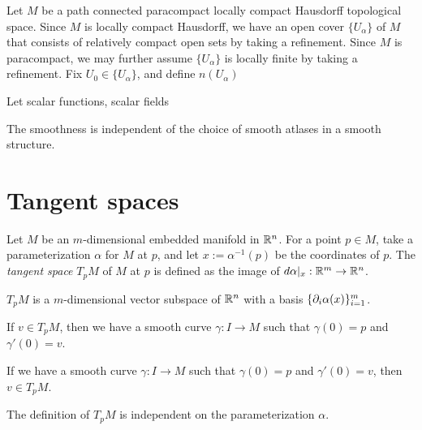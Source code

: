 \documentclass{../../large}
\renewcommand{\a}{\alpha}
\begin{document}
\begin{prb}

\end{prb}
\begin{pf}
Let $M$ be a path connected paracompact locally compact Hausdorff topological space.
Since $M$ is locally compact Hausdorff, we have an open cover $\{U_\alpha\}$ of $M$ that consists of relatively compact open sets by taking a refinement.
Since $M$ is paracompact, we may further assume $\{U_\alpha\}$ is locally finite by taking a refinement.
Fix $U_0\in\{U_\alpha\}$, and define $n(U_\alpha)$

\end{pf}

\begin{prb}
Let
scalar functions, scalar fields
\begin{parts}
\item The smoothness is independent of the choice of smooth atlases in a smooth structure.
\end{parts}
\end{prb}






\section{Tangent spaces}


\begin{prb}
Let $M$ be an $m$-dimensional embedded manifold in $\mathbb{R}^n$.
For a point $p\in M$, take a parameterization $\a$ for $M$ at $p$, and let $x:=\a^{-1}(p)$ be the coordinates of $p$.
The \emph{tangent space} $T_pM$ of $M$ at $p$ is defined as the image of $d\a|_x:\R^m\to\R^n$.
\begin{parts}
\item $T_pM$ is a $m$-dimensional vector subspace of $\mathbb{R}^n$ with a basis $\{\pd_i\alpha(x)\}_{i=1}^m$.
\item If $v\in T_pM$, then we have a smooth curve $\gamma:I\to M$ such that $\gamma(0)=p$ and $\gamma'(0)=v$.
\item If we have a smooth curve $\gamma:I\to M$ such that $\gamma(0)=p$ and $\gamma'(0)=v$, then $v\in T_pM$.
\item The definition of $T_pM$ is independent on the parameterization $\a$.
\end{parts}
\end{prb}
\end{document}
